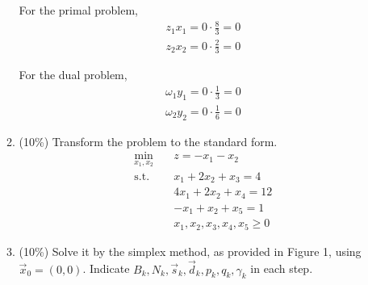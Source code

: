 \documentclass[a4paper,10pt]{article}
\begin{document}
\begin{enumerate}
\begin{enumerate}
{            For the primal problem, 
            \begin{align}
                z_1 x_1 = 0 \cdot \frac{8}{3} = 0 \\
                z_2 x_2 = 0 \cdot \frac{2}{3} = 0
            \end{align}

            For the dual problem, 
            \begin{align}
                \omega_1 y_1 = 0 \cdot \frac{1}{3} = 0 \\
                \omega_2 y_2 = 0 \cdot \frac{1}{6} = 0
            \end{align}
        }

        \item (10\%) Transform the problem to the standard form.
        {\color{blue} 
            \begin{equation}
                \begin{aligned}
                    \min_{x_1,x_2} \quad & z = - x_1 - x_2 \\
                    \textrm{s.t.} \quad & x_1 + 2x_2 + x_3 = 4 \\
                        \quad & 4x_1 + 2x_2 + x_4 =  12   \\
                        \quad & -x_1 + x_2 + x_5 = 1  \\
                        \quad & x_1, x_2, x_3, x_4, x_5 \geq 0
                \end{aligned}
            \end{equation}
        }

        \item (10\%) Solve it by the simplex method, as provided in Figure 1, using $\vec{x}_0 = (0, 0)$.
        Indicate $B_k, N_k, \vec{s}_k, \vec{d}_k, p_k, q_k, \gamma_k$ in each step.\
        

\end{enumerate}
\end{enumerate}
\end{document}
